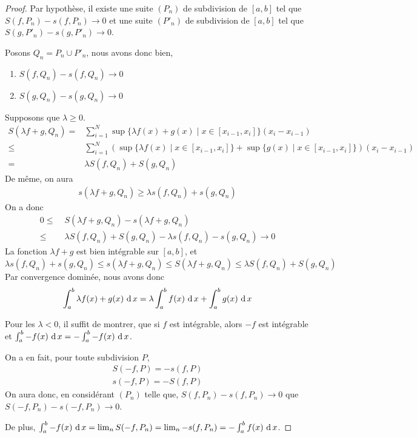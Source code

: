 \begin{proof}
    Par hypothèse, il existe une suite $(P_n)$ de subdivision de $[a,b]$ tel que $S(f,P_n)-s(f,P_n) \to 0$ et une suite $(P'_n)$ de subdivision de $[a,b]$ tel que $S(g,P'_n)-s(g,P'_n) \to 0$.

Posons $Q_n = P_n \cup P'_n$, nous avons donc bien, 
    \begin{enumerate}
        \item $S(f,Q_n)-s(f,Q_n) \to 0$
        \item $S(g,Q_n)-s(g,Q_n) \to 0$
    \end{enumerate}

    Supposons que $\lambda \ge 0$.
\begin{align*}
    S(\lambda f + g,Q_n) =& \sum_{i=1}^N\sup\{\lambda f(x) + g(x) \;| \; x\in [x_{i-1},x_i]\}(x_i-x_{i-1})\\ \le & \sum_{i=1}^N (\sup\{\lambda f(x) \;| \; x\in [x_{i-1},x_i]\} + \sup\{g(x) \;| \; x\in [x_{i-1},x_i]\})(x_i-x_{i-1})\\ 
    =& \lambda S(f,Q_n) + S(g,Q_n)
\end{align*}
    De même, on aura 
    \begin{align*}
        s(\lambda f + g,Q_n) \ge \lambda s(f,Q_n) + s(g,Q_n)
    \end{align*}
    On a donc
    \begin{align*}
        0 \le& \;S(\lambda f + g,Q_n) - s(\lambda f + g,Q_n) \\
        \le&\;\lambda S(f,Q_n) + S(g,Q_n) -\lambda s(f,Q_n) - s(g,Q_n) \to 0
    \end{align*}
    La fonction $\lambda f + g$ est bien intégrable sur $[a,b]$, et $ \lambda s(f,Q_n) + s(g,Q_n) \le s(\lambda f + g,Q_n) \le S(\lambda f + g,Q_n) \le \lambda S(f,Q_n) + S(g,Q_n)$
    Par convergence dominée, nous avons donc 
    \begin{align*}
        \int_a^b\lambda f(x) + g(x) \,\operatorname{d} x =\lambda \int_a^bf(x) \,\operatorname{d} x + \int_a^bg(x)\,\operatorname{d} x
    \end{align*}

    Pour les $\lambda < 0$, il suffit de montrer, que si $f$ est intégrable, alors $-f$ est intégrable et $\int_a^b-f(x)\,\operatorname{d} x = -\int_a^b-f(x)\,\operatorname{d} x$.

    On a en fait, pour toute subdivision $P$,
    \begin{align*}
        S(-f,P) = -s(f,P) \\
        s(-f,P) = -S(f,P)
    \end{align*}
    On aura donc, en considérant $(P_n)$ telle que, $S(f,P_n)-s(f,P_n) \to 0$ que $S(-f,P_n)-s(-f,P_n) \to 0$.

    De plus, $\int_a^b-f(x)\,\operatorname{d} x = \lim_n S(-f,P_n) = \lim_n-s(f,P_n) = -\int_a^bf(x)\,\operatorname{d} x$.
\end{proof}

